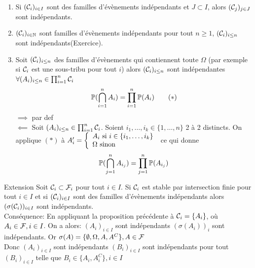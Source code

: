 \documentclass[]{report}
\begin{document}
    \begin{re}{}{}
        \begin{enumerate}
            \item Si $(\mathcal{C}_i)_{i\in I}$ sont des familles d'évènements indépendants et $J\subset I$, alors $(\mathcal{C}_j)_{j\in J}$ sont indépendants.
            \item $(\mathcal{C}_i)_{i\in \mathbb{N}}$ sont familles d'évènements indépendants \ssi pour tout $n\ge 1$, $(\mathcal{C}_i)_{i\le n}$ sont indépendants(Exercice).
            \item Soit $(\mathcal{C}_i)_{i\le n}$ des familles d'évènements qui contiennent toute $\Omega$ (par exemple si $\mathcal{C}_i$ est une sous-tribu pour tout $i$) alors $(\mathcal{C}_i)_{i\le n}$ sont indépendantes \ssi $\forall (A_i)_{i\le n}\in\prod_{i=1}^{n}\mathcal{C}_i$
            \[\mathbb{P}(\bigcap_{i=1}^nA_i)=\prod_{i=1}^{n}\mathbb{P}(A_i)\qquad (*)\]
            $\implies$ par def\\
            $\impliedby$ Soit $(A_i)_{i\le n}\in \prod_{i=1}^{n}\mathcal{C}_i$. Soient $i_1,\ldots,i_k\in\{1,\ldots,n\}$ 2 à 2 distincts. On applique $(*)$ à $A_i'=\left\{\begin{array}{ll} A_i\text{ si $i\in\{i_1,\ldots,i_k\}$}\\ \Omega\text{ sinon} \end{array} \right.$ ce qui donne
            \[\mathbb{P}(\bigcap_{j=1}^nA_{i_j})=\prod_{j=1}^{n}\mathbb{P}(A_{i_j})\]
        \end{enumerate}
    \end{re}

    \begin{prop}{Extension}{}
        Soit $\mathcal{C}_i\subset \mathcal{F}_i$ pour tout $i\in I$. Si $\mathcal{C}_i$ est stable par intersection finie pour tout $i\in I$ et si $(\mathcal{C}_i)_{i\in I}$ sont des familles d'évènements indépendants alors $(\sigma(\mathcal{C}_i))_{i\in I}$ sont indépendants.\\
        Conséquence: En appliquant la proposition précédente à $\mathcal{C}_i=\{A_i\}$, où $A_i\in \mathcal{F},i\in I$. On a alors: $(A_i)_{i\in I}$ sont indépendants \ssi $(\sigma(A_i))_i$ sont indépendants. Or $\sigma(A)=\{\emptyset,\Omega,A,A^C\},A\in \mathcal{F}$\\
        Donc $(A_i)_{i\in I}$ sont indépendants \ssi $(B_i)_{i\in I}$ sont indépendants pour tout $(B_i)_{i\in I}$ telle que $B_i\in \{A_i,A_i^C\},i\in I$
    \end{prop}
\end{document}
